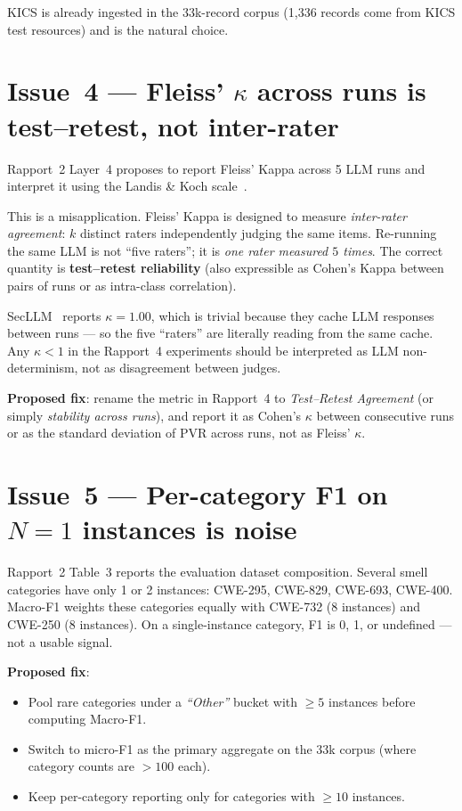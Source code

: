 \documentclass[11pt, a4paper]{report}
\begin{document}
KICS is already ingested in the 33k-record corpus (1{,}336 records come
from KICS test resources) and is the natural choice.

\section{Issue~4 --- Fleiss' $\kappa$ across runs is test--retest, not inter-rater}

Rapport~2 Layer~4 proposes to report Fleiss' Kappa across 5 LLM runs and
interpret it using the Landis \& Koch scale~\citep{landis1977kappa}.

This is a misapplication. Fleiss' Kappa is designed to measure
\emph{inter-rater agreement}: $k$ distinct raters independently judging the
same items. Re-running the same LLM is not ``five raters''; it is
\emph{one rater measured $5$ times}. The correct quantity is
\textbf{test--retest reliability} (also expressible as Cohen's Kappa
between pairs of runs or as intra-class correlation).

SecLLM~\citep{devito2025secllm} reports $\kappa = 1.00$, which is trivial
because they cache LLM responses between runs --- so the five ``raters''
are literally reading from the same cache. Any $\kappa < 1$ in the
Rapport~4 experiments should be interpreted as LLM non-determinism, not
as disagreement between judges.

\textbf{Proposed fix}: rename the metric in Rapport~4 to
\emph{Test--Retest Agreement} (or simply \emph{stability across runs}),
and report it as Cohen's $\kappa$ between consecutive runs or as the
standard deviation of PVR across runs, not as Fleiss' $\kappa$.

\section{Issue~5 --- Per-category F1 on $N=1$ instances is noise}

Rapport~2 Table~3 reports the evaluation dataset composition.
Several smell categories have only 1 or 2 instances:
CWE-295, CWE-829, CWE-693, CWE-400. Macro-F1 weights these categories
equally with CWE-732 (8 instances) and CWE-250 (8 instances). On a
single-instance category, F1 is 0, 1, or undefined --- not a usable
signal.

\textbf{Proposed fix}:

\begin{itemize}
  \item Pool rare categories under a \emph{``Other''} bucket with
        $\geq 5$ instances before computing Macro-F1.
  \item Switch to micro-F1 as the primary aggregate on the 33k corpus
        (where category counts are $> 100$ each).
  \item Keep per-category reporting only for categories with
        $\geq 10$ instances.
\end{itemize}
\end{document}
